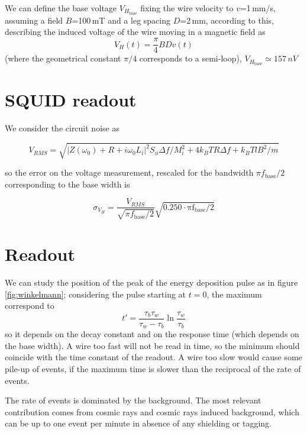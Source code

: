 \documentclass[a4paper,12pt]{article}
\begin{document}
We can define the base voltage $V_{H_{\mathrm{base}}}$ fixing the wire velocity to $v$=1\,mm/s, assuming a field $B$=100\,mT and a leg spacing $D$=2\,mm, according to this, describing the induced voltage of the wire moving in a magnetic field as
\begin{equation}
V_H(t) = \frac{\pi}{4} B D v(t)
\end{equation}
(where the geometrical constant $\pi/4$ corresponds to a semi-loop), $V_{H_{\mathrm{base}}} \simeq 157\,nV$ 


\section{SQUID readout}
We consider the circuit noise as

\begin{equation}
V_{RMS}  = \sqrt{\big|Z(\omega_0) + R + i\omega_0 L_i\big|^2 S_\phi \Delta f / M_i^2 + 4 k_B T R \Delta f + k_B T l B^2 / m}
\end{equation}

so the error on the voltage measurement, rescaled for the bandwidth $\pi f_\mathrm{base}/2$ corresponding to the base width is

\begin{equation}
\sigma_{V_H} = \frac{V_{RMS}}{\sqrt{\pi f_\mathrm{base}/2}} \sqrt{\mathrm{0.250 \cdot \pi f_\mathrm{base}/2}}
\end{equation}



\section{Readout}

We can study the position of the peak of the energy deposition pulse as in figure \ref{fig:winkelmann}; considering the pulse starting at $t=0$, the maximum correspond to
\begin{equation}
t' = \frac{\tau_b \tau_w}{\tau_w - \tau_b} \ln \frac{\tau_w}{\tau_b}
\end{equation}
so it depends on the decay constant and on the response time (which depends on the base width).
A wire too fast will not be read in time, so the minimum should coincide with the time constant of the readout.
A wire too slow would cause some pile-up of events, if the maximum time is slower than the reciprocal of the rate of events.

The rate of events is dominated by the background. The most relevant contribution comes from cosmic rays and cosmic rays induced background, which can be up to one event per minute in absence of any shielding or tagging.
\end{document}
